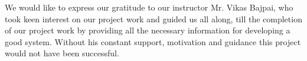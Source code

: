 We would like to express our gratitude to our instructor Mr. Vikas Bajpai, who took keen interest on our project work and guided us all along, till the completion of our project work by providing all the necessary information for developing a good system. Without his constant support, motivation and guidance this project would not have been successful.